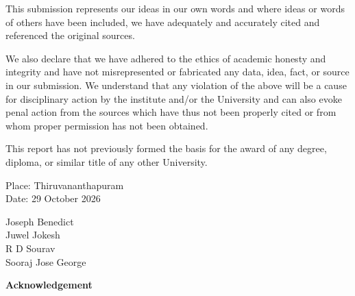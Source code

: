 \documentclass[12pt,a4paper]{report}
\begin{document}
\noindent
This submission represents our ideas in our own words and where ideas or words of others have been included, we have adequately and accurately cited and referenced the original sources.

\par
\vspace{0.3cm}

\noindent
We also declare that we have adhered to the ethics of academic honesty and integrity and have not misrepresented or fabricated any data, idea, fact, or source in our submission. We understand that any violation of the above will be a cause for disciplinary action by the institute and/or the University and can also evoke penal action from the sources which have thus not been properly cited or from whom proper permission has not been obtained.

\par
\vspace{0.3cm}

\noindent
This report has not previously formed the basis for the award of any degree, diploma, or similar title of any other University.

\vspace{1.0cm}

\noindent
\begin{minipage}[t]{0.45\linewidth}
    \vspace{0pt}
    Place: Thiruvananthapuram\\
    Date: 29 October 2026
\end{minipage}
\hfill
\begin{minipage}[t]{0.45\linewidth}
    \vspace{0pt}
    \raggedleft
    Joseph Benedict\\[0.4cm]
    Juwel Jokesh\\[0.4cm]
    R D Sourav\\[0.4cm]
    Sooraj Jose George
\end{minipage}


\newpage
{}
\setcounter{page}{1}

\begin{center}
    \textbf{\Large Acknowledgement}
\end{center}

\vspace{0.4cm}
\end{document}
